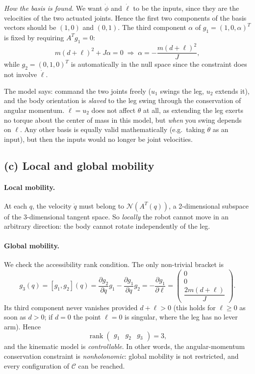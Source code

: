 \documentclass[11pt,a4paper]{article}
\def\boldsymbol#1{#1}%
\DeclareMathOperator{\rank}{rank}
\newcommand{\q}{\boldsymbol{q}}
\newcommand{\g}{\boldsymbol{g}}
\theoremstyle{definition}
\theoremstyle{plain}
\theoremstyle{remark}
\begin{document}
\emph{How the basis is found.} We want $\dot\phi$ and $\dot\ell$ to be the inputs, since they are the velocities of the two actuated joints. Hence the first two components of the basis vectors should be $(1,0)$ and $(0,1)$. The third component $\alpha$ of $\g_1=(1,0,\alpha)^T$ is fixed by requiring $A^T\g_1=0$:
\[
  m(d+\ell)^2+J\alpha=0\;\Longrightarrow\;\alpha=-\frac{m(d+\ell)^2}{J},
\]
while $\g_2=(0,1,0)^T$ is automatically in the null space since the constraint does not involve $\dot\ell$.

\begin{intuition}
The model says: command the two joints freely ($u_1$ swings the leg, $u_2$ extends it), and the body orientation is \emph{slaved} to the leg swing through the conservation of angular momentum. $\dot\ell=u_2$ does not affect $\theta$ at all, as extending the leg exerts no torque about the center of mass in this model, but \emph{when} you swing depends on $\ell$. Any other basis is equally valid mathematically (e.g.\ taking $\dot\theta$ as an input), but then the inputs would no longer be joint velocities.
\end{intuition}

\subsection{(c) Local and global mobility}

\paragraph{Local mobility.} At each $\q$, the velocity $\dot\q$ must belong to $\mathcal N(A^T(\q))$, a 2-dimensional subspace of the 3-dimensional tangent space. So \emph{locally} the robot cannot move in an arbitrary direction: the body cannot rotate independently of the leg.

\paragraph{Global mobility.} We check the accessibility rank condition. The only non-trivial bracket is
\begin{equation}
  \g_3(\q)=[\g_1,\g_2](\q)=\frac{\partial\g_2}{\partial\q}\g_1-\frac{\partial\g_1}{\partial\q}\g_2
  =-\frac{\partial\g_1}{\partial\ell}
  =\begin{pmatrix}0\\0\\ \dfrac{2m(d+\ell)}{J}\end{pmatrix}.
\end{equation}
Its third component never vanishes provided $d+\ell>0$ (this holds for $\ell\ge0$ as soon as $d>0$; if $d=0$ the point $\ell=0$ is singular, where the leg has no lever arm). Hence
\[
  \rank\begin{pmatrix}\g_1&\g_2&\g_3\end{pmatrix}=3 ,
\]
and the kinematic model is \emph{controllable}. In other words, the angular-momentum conservation constraint is \emph{nonholonomic}: global mobility is not restricted, and every configuration of $\mathcal C$ can be reached.
\end{document}

